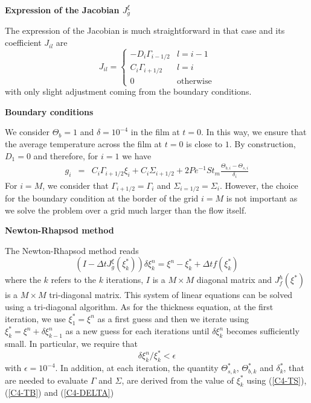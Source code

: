 \vspace{.5cm}  \textbf{Expression   of  the   Jacobian  $J_{g}^{\xi}$}
\vspace{.5cm}

The expression  of the Jacobian  is much straightforward in  that case
and its coefficient $J_{il}$ are
\begin{equation}
  J_{il}=
  \begin{cases}
    -D_i\Gamma_{i-1/2}&
    l = i-1\\
    C_i\Gamma_{i+1/2} & l = i \\
    0 & \text{otherwise}
  \end{cases}
  \label{C4-C2-eq12}
\end{equation}
with only slight adjustment coming from the boundary conditions.

\vspace{.5cm} \textbf{Boundary conditions} \vspace{.5cm}

We  consider $\Theta_b  =1$  and $\delta  = 10^{-4}$  in  the film  at
$t=0$. In this way, we ensure  that the average temperature across the
film at $t=0$ is close to $1$. By construction, $D_1=0$ and therefore,
for $i=1$ we have
\begin{eqnarray}
  g_i &=& C_i\Gamma_{i+1/2}\xi_{i}+ C_i\Sigma_{i+1/2} +2Pe^{-1}St_m\frac{\Theta_{b,i}-\Theta_{s,i}}{\delta_i}
\end{eqnarray}
For   $i=M$,   we    consider   that   $\Gamma_{i+1/2}=\Gamma_i$   and
$\Sigma_{i=1/2}=\Sigma_i$.   However,  the  choice  for  the  boundary
condition at the border of the grid $i=M$ is not important as we solve
the problem over a grid much larger than the flow itself.

\vspace{.5cm} \textbf{Newton-Rhapsod method} \vspace{.5cm}

The Newton-Rhapsod method reads
\begin{equation}
  (I-\Delta tJ^{\xi}_{g}(\xi_k^*))\delta \xi_k^n=\xi^n-\xi_k^*+\Delta t f(\xi_k^*)
\end{equation}
where the  $k$ refers  to the $k$  iterations, $I$ is  a $M  \times M$
diagonal  matrix and  $J_f^h(\xi^*)$ is  a $M  \times M$  tri-diagonal
matrix.   This  system of  linear  equations  can  be solved  using  a
tri-diagonal algorithm.  As  for the thickness equation,  at the first
iteration,  we use  $\xi^*_1 =  \xi^n$ as  a first  guess and  then we
iterate using $\xi^*_k = \xi^n+\delta  \xi_{k-1}^n$ as a new guess for
each iterations  until $\delta \xi^n_{k}$ becomes  sufficiently small.
In particular, we require that
\begin{equation}
  \delta \xi^n_k/\xi^*_{k}<\epsilon
\end{equation}
with  $\epsilon  = 10^{-4}$.   In  addition,  at each  iteration,  the
quantity $\Theta^*_{s,k}$, $\Theta^*_{b,k}$ and $\delta^*_k$, that are
needed to evaluate  $\Gamma$ and $\Sigma$, are derived  from the value
of $\xi^*_{k}$ using (\ref{C4-TS}), (\ref{C4-TB}) and (\ref{C4-DELTA})

